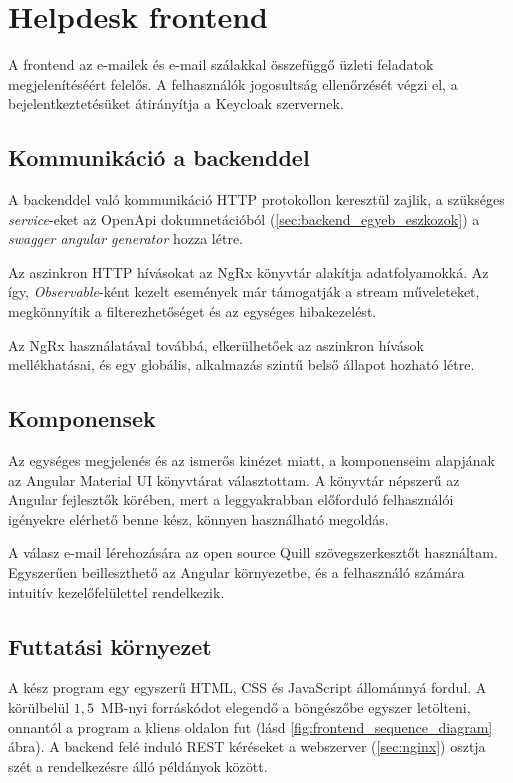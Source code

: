 \section{Helpdesk frontend}
A frontend az e-mailek és e-mail szálakkal összefüggő üzleti feladatok megjelenítéséért felelős. A felhasználók jogosultság ellenőrzését végzi el, a bejelentkeztetésüket átirányítja a Keycloak szervernek. 


\subsection{Kommunikáció a backenddel}
A backenddel való kommunikáció HTTP protokollon keresztül zajlik, a szükséges \textit{service}-eket az OpenApi dokumnetációból (\ref{sec:backend_egyeb_eszkozok}) a \textit{swagger angular generator} hozza létre.

Az aszinkron HTTP hívásokat az NgRx könyvtár alakítja adatfolyamokká. 
Az így, \textit{Observable}-ként kezelt események már támogatják a stream műveleteket, megkönnyítik a filterezhetőséget és az egységes hibakezelést. 

Az NgRx használatával továbbá, elkerülhetőek az aszinkron hívások mellékhatásai, és egy globális, alkalmazás szintű belső állapot hozható létre.

\subsection{Komponensek}
Az egységes megjelenés és az ismerős kinézet miatt, a komponenseim alapjának az Angular Material UI könyvtárat választottam. A könyvtár	népszerű az Angular fejlesztők körében, mert a leggyakrabban előforduló felhasználói igényekre elérhető benne kész, könnyen használható megoldás.

A válasz e-mail lérehozására az open source Quill szövegszerkesztőt használtam.
Egyszerűen beilleszthető az Angular környezetbe, és a felhasználó számára intuitív kezelőfelülettel rendelkezik.


\subsection{Futtatási környezet}
A kész program egy egyszerű HTML, CSS és JavaScript állománnyá fordul. A körülbelül $1,5$~MB-nyi forráskódot elegendő a böngészőbe egyszer letölteni, onnantól a program a kliens oldalon fut (lásd \ref{fig:frontend_sequence_diagram} ábra). A backend felé induló REST kéréseket a webszerver (\ref{sec:nginx}) osztja szét a rendelkezésre álló példányok között.

